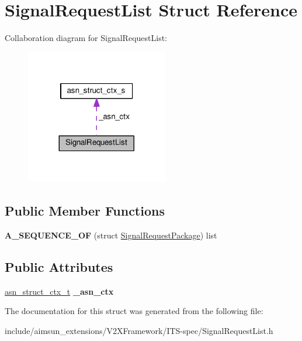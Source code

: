 \hypertarget{structSignalRequestList}{}\section{Signal\+Request\+List Struct Reference}
\label{structSignalRequestList}


Collaboration diagram for Signal\+Request\+List\+:\nopagebreak
\begin{figure}[H]
\begin{center}
\leavevmode
\includegraphics[width=176pt]{structSignalRequestList__coll__graph}
\end{center}
\end{figure}
\subsection*{Public Member Functions}
\begin{DoxyCompactItemize}
\item 
{\bfseries A\+\_\+\+S\+E\+Q\+U\+E\+N\+C\+E\+\_\+\+OF} (struct \hyperlink{structSignalRequestPackage}{Signal\+Request\+Package}) list\hypertarget{structSignalRequestList_aad6c23c2651422257bb2adf3fb46d916}{}\label{structSignalRequestList_aad6c23c2651422257bb2adf3fb46d916}

\end{DoxyCompactItemize}
\subsection*{Public Attributes}
\begin{DoxyCompactItemize}
\item 
\hyperlink{structasn__struct__ctx__s}{asn\+\_\+struct\+\_\+ctx\+\_\+t} {\bfseries \+\_\+asn\+\_\+ctx}\hypertarget{structSignalRequestList_a09852b244882ad6b3276e22191d91662}{}\label{structSignalRequestList_a09852b244882ad6b3276e22191d91662}

\end{DoxyCompactItemize}


The documentation for this struct was generated from the following file\+:\begin{DoxyCompactItemize}
\item 
include/aimsun\+\_\+extensions/\+V2\+X\+Framework/\+I\+T\+S-\/spec/Signal\+Request\+List.\+h\end{DoxyCompactItemize}
